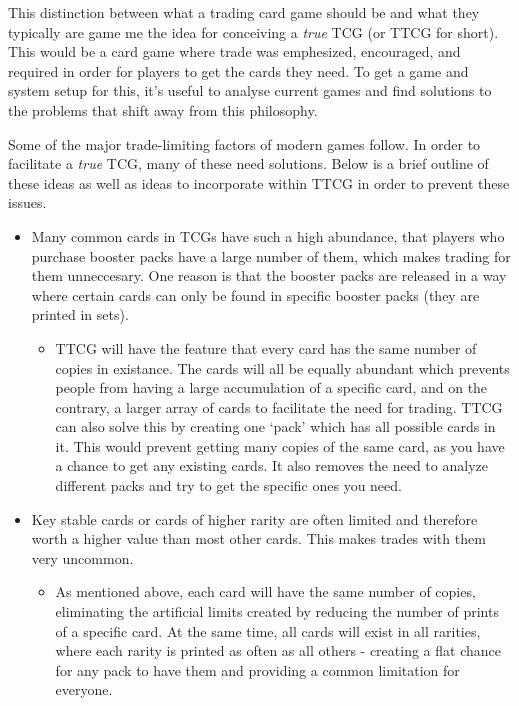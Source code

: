 This distinction between what a trading card game should be and what they typically are game me the idea for conceiving a \textit{true} TCG (or TTCG for short). This would be a card game where trade was emphesized, encouraged, and required in order for players to get the cards they need. To get a game and system setup for this, it's useful to analyse current games and find solutions to the problems that shift away from this philosophy.

Some of the major trade-limiting factors of modern games follow. In order to facilitate a \textit{true} TCG, many of these need solutions. Below is a brief outline of these ideas as well as ideas to incorporate within TTCG in order to prevent these issues.
\begin{itemize}
	\item Many common cards in TCGs have such a high abundance, that players who purchase booster packs have a large number of them, which makes trading for them unneccesary. One reason is that the booster packs are released in a way where certain cards can only be found in specific booster packs (they are printed in sets).
 	\begin{itemize}
		\item TTCG will have the feature that every card has the same number of copies in existance. The cards will all be equally abundant which prevents people from having a large accumulation of a specific card, and on the contrary, a larger array of cards to facilitate the need for trading. TTCG can also solve this by creating one `pack' which has all possible cards in it. This would prevent getting many copies of the same card, as you have a chance to get any existing cards. It also removes the need to analyze different packs and try to get the specific ones you need.
  	\end{itemize}
 	\item Key stable cards or cards of higher rarity are often limited and therefore worth a higher value than most other cards. This makes trades with them very uncommon.
 	\begin{itemize}
		\item As mentioned above, each card will have the same number of copies, eliminating the artificial limits created by reducing the number of prints of a specific card. At the same time, all cards will exist in all rarities, where each rarity is printed as often as all others - creating a flat chance for any pack to have them and providing a common limitation for everyone.
  	\end{itemize}

\end{itemize}
